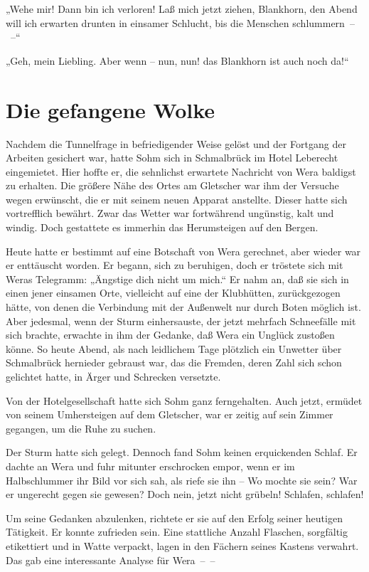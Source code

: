 „Wehe mir! Dann bin ich verloren! Laß mich jetzt ziehen, Blankhorn,
den Abend will ich erwarten drunten in einsamer Schlucht, bis die
Menschen schlummern~–~–“

„Geh, mein Liebling. Aber wenn – nun, nun! das Blankhorn ist auch
noch da!“

\section{Die gefangene Wolke}

Nachdem die Tunnelfrage in befriedigender Weise gelöst und der
Fortgang der Arbeiten gesichert war, hatte Sohm sich in Schmalbrück
im Hotel Leberecht eingemietet. Hier hoffte er, die sehnlichst
erwartete Nachricht von Wera baldigst zu erhalten. Die größere Nähe
des Ortes am Gletscher war ihm der Versuche wegen erwünscht, die er
mit seinem neuen Apparat anstellte. Dieser hatte sich vortrefflich
bewährt. Zwar das Wetter war fortwährend ungünstig, kalt und
windig. Doch gestattete es immerhin das Herumsteigen auf den
Bergen.

Heute hatte er bestimmt auf eine Botschaft von Wera gerechnet, aber
wieder war er enttäuscht worden. Er begann, sich zu beruhigen, doch
er tröstete sich mit Weras Telegramm: „Ängstige dich nicht um
mich.“ Er nahm an, daß sie sich in einen jener einsamen Orte,
vielleicht auf eine der Klubhütten, zurückgezogen hätte, von denen
die Verbindung mit der Außenwelt nur durch Boten möglich ist. Aber
jedesmal, wenn der Sturm einhersauste, der jetzt mehrfach
Schneefälle mit sich brachte, erwachte in ihm der Gedanke, daß Wera
ein Unglück zustoßen könne. So heute Abend, als nach leidlichem
Tage plötzlich ein Unwetter über Schmalbrück hernieder gebraust
war, das die Fremden, deren Zahl sich schon gelichtet hatte, in
Ärger und Schrecken versetzte.

Von der Hotelgesellschaft hatte sich Sohm ganz ferngehalten. Auch
jetzt, ermüdet von seinem Umhersteigen auf dem Gletscher, war er
zeitig auf sein Zimmer gegangen, um die Ruhe zu suchen.

Der Sturm hatte sich gelegt. Dennoch fand Sohm keinen erquickenden
Schlaf. Er dachte an Wera und fuhr mitunter erschrocken empor, wenn
er im Halbschlummer ihr Bild vor sich sah, als riefe sie ihn – Wo
mochte sie sein? War er ungerecht gegen sie gewesen? Doch nein,
jetzt nicht grübeln! Schlafen, schlafen!

Um seine Gedanken abzulenken, richtete er sie auf den Erfolg seiner
heutigen Tätigkeit. Er konnte zufrieden sein. Eine stattliche
Anzahl Flaschen, sorgfältig etikettiert und in Watte verpackt,
lagen in den Fächern seines Kastens verwahrt. Das gab eine
interessante Analyse für Wera~–~–

